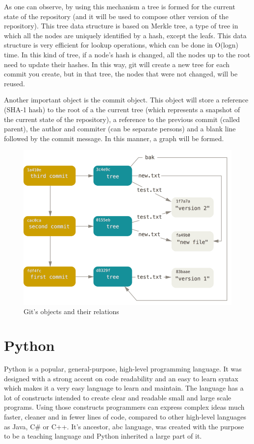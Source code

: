         As one can observe, by using this mechanism a tree is formed for the current state of the repository (and it will be used to compose other version of the repository). This tree data structure is based on Merkle tree, a type of tree in which all the nodes are uniquely identified by a hash, except the leafs. This data structure is very efficient for lookup operations, which can be done in O(logn) time. In this kind of tree, if a node's hash is changed, all the nodes up to the root need to update their hashes. In this way, git will create a new tree for each commit you create, but in that tree, the nodes that were not changed, will be reused.
        
        Another important object is the commit object. This object will store a reference (SHA-1 hash) to the root of a the current tree (which represents a snapshot of the current state of the repository), a reference to the previous commit (called parent), the author and commiter (can be separate persons) and a blank line followed by the commit message. In this manner, a graph will be formed.
        
         \begin{figure}[h]
           \begin{center}
               \includegraphics[width=15cm]{theoretical/data-model-3.png}
            \end{center}
            \label{fig:git-objects}\caption{Git's objects and their relations}
        \end{figure}
    
\section{Python}
    Python is a popular, general-purpose, high-level programming language. It was designed with a strong accent on code readability and an easy to learn syntax which makes it a very easy language to learn and maintain. The language has a lot of constructs intended to create clear and readable small and large scale programs. Using those constructs programmers can express complex ideas much faster, cleaner and in fewer lines of code, compared to other high-level languages as Java, C\# or C++. It's ancestor, abc language, was created with the purpose to be a teaching language and Python inherited a large part of it.
    
